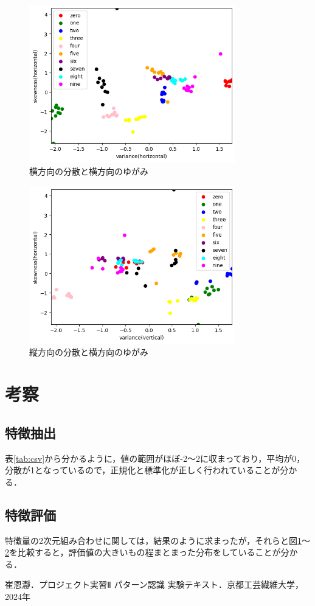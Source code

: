 \documentclass{jlreq}
\numberwithin{equation}{section}
\begin{document}
\begin{figure}[H]
  \centering
  \includegraphics[width=0.8\textwidth]{image/vx_sx.png}
  \caption{横方向の分散と横方向のゆがみ}
  \label{fig:vx_sx}
\end{figure}

\begin{figure}[H]
  \centering
  \includegraphics[width=0.8\textwidth]{image/vy_sx.png}
  \caption{縦方向の分散と横方向のゆがみ}
  \label{fig:vy_sx}
\end{figure}

\section{考察}
\subsection{特徴抽出}
表\ref{tab:csv}から分かるように，値の範囲がほぼ-2～2に収まっており，平均が0，分散が1となっているので，正規化と標準化が正しく行われていることが分かる．

\subsection{特徴評価}
特徴量の2次元組み合わせに関しては，結果のように求まったが，それらと図\ref{fig:vx_sx}～\ref{fig:vy_sx}を比較すると，評価値の大きいもの程まとまった分布をしていることが分かる．

\begin{thebibliography}{9}
  \item 崔恩瀞．プロジェクト実習Ⅱ パターン認識 実験テキスト．京都工芸繊維大学，2024年
\end{thebibliography}
\end{document}
